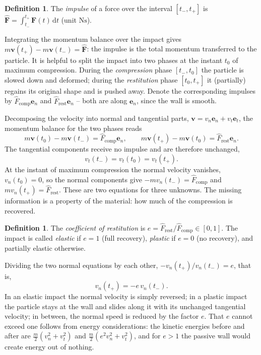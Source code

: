 \documentclass[11pt,a4paper,oneside]{report}
\numberwithin{equation}{chapter}
\newcommand{\vect}[1]{\bm{#1}}
\newcommand{\e}[1]{\vect{e}_{#1}}
\newcommand{\dd}{\,\mathrm{d}}
\theoremstyle{plain}
\theoremstyle{definition}
\newtheorem{definition}[theorem]{Definition}
\theoremstyle{remark}
\begin{document}
\begin{definition}
The \emph{impulse} of a force over the interval $[t_-,t_+]$ is $\hat{\vect F}=\int_{t_-}^{t_+}\vect F(t)\dd t$
(unit $\si{\newton\second}$).
\end{definition}

Integrating the momentum balance over the impact gives $m\vect v(t_+)-m\vect v(t_-)=\hat{\vect F}$: the impulse is
the total momentum transferred to the particle. It is helpful to split the impact into two phases at the instant
$t_0$ of maximum compression. During the \emph{compression} phase $[t_-,t_0]$ the particle is slowed down and
deformed; during the \emph{restitution} phase $[t_0,t_+]$ it (partially) regains its original shape and is pushed
away. Denote the corresponding impulses by $\hat F_{\text{comp}}\e n$ and $\hat F_{\text{rest}}\e n$ -- both are along
$\e n$, since the wall is smooth.

Decomposing the velocity into normal and tangential parts, $\vect v=v_n\e n+v_t\e t$, the momentum balance for the
two phases reads
\[
  m\vect v(t_0)-m\vect v(t_-)=\hat F_{\text{comp}}\e n,\qquad m\vect v(t_+)-m\vect v(t_0)=\hat F_{\text{rest}}\e n .
\]
The tangential components receive no impulse and are therefore unchanged,
\begin{equation}
  v_t(t_-)=v_t(t_0)=v_t(t_+).
\end{equation}
At the instant of maximum compression the normal velocity vanishes, $v_n(t_0)=0$, so the normal components give
$-mv_n(t_-)=\hat F_{\text{comp}}$ and $mv_n(t_+)=\hat F_{\text{rest}}$. These are two equations for three unknowns.
The missing information is a property of the material: how much of the compression is recovered.

\begin{definition}
The \emph{coefficient of restitution} is $e=\hat F_{\text{rest}}/\hat F_{\text{comp}}\in[0,1]$. The impact is called
\emph{elastic} if $e=1$ (full recovery), \emph{plastic} if $e=0$ (no recovery), and partially elastic otherwise.
\end{definition}

Dividing the two normal equations by each other, $-v_n(t_+)/v_n(t_-)=e$, that is,
\begin{equation}
  v_n(t_+)=-e\,v_n(t_-).
\end{equation}
In an elastic impact the normal velocity is simply reversed; in a plastic impact the particle stays at the wall and
slides along it with its unchanged tangential velocity; in between, the normal speed is reduced by the factor $e$.
That $e$ cannot exceed one follows from energy considerations: the kinetic energies before and after are
$\frac m2(v_n^2+v_t^2)$ and $\frac m2(e^2v_n^2+v_t^2)$, and for $e>1$ the passive wall would create energy out of
nothing.
\end{document}
